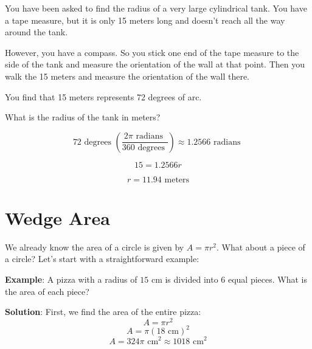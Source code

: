 \begin{Exercise}[title={Arc Length}, label=arc_length]

You have been asked to find the radius of a very large cylindrical tank.
You have a tape measure, but it is only 15 meters long and doesn't
reach all the way around the tank.

However, you have a compass.  So you stick one end of the tape measure
to the side of the tank and measure the orientation of the wall at
that point.  Then you walk the 15 meters and measure the orientation of the 
wall there.

You find that 15 meters represents 72 degrees of arc.

What is the radius of the tank in meters?
  
\end{Exercise}
\begin{Answer}[ref=arc_length]

  $$72 \text{ degrees } \left(\frac{2\pi \text{ radians }}{360 \text{ degrees }
  }\right) \approx 1.2566 \text{ radians }$$

  $$15 = 1.2566r$$

  $$r = 11.94 \text{ meters}$$
  
\end{Answer}

\section{Wedge Area}
We already know the area of a circle is given by $A = \pi r^2$. What about a 
piece of a circle? Let's start with a straightforward example:

\textbf{Example}: A pizza with a radius of $15$ cm is divided into 6 equal 
pieces. What is the area of each piece?

\textbf{Solution}: First, we find the area of the entire pizza:
$$A = \pi r^2$$
$$A = \pi (18\text{ cm})^2$$
$$A = 324\pi\text{ cm}^2 \approx 1018\text{ cm}^2$$

